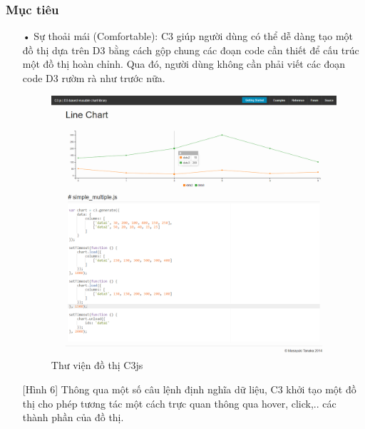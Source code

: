\documentclass[12pt,a4paper]{article}
\begin{document}
\subsubsection{Mục tiêu}
\begin{itemize}
        \item[•]Sự thoải mái (Comfortable):
        C3 giúp người dùng có thể dễ dàng tạo một đồ thị dựa trên D3 bằng cách gộp chung các đoạn code cần thiết để cấu trúc một đồ thị hoàn chỉnh. Qua đó, người dùng không cần phải viết các đoạn code D3 rườm rà như trước nữa.
\begin{figure}[htp]
	\begin{center}
    \includegraphics[scale=.3]{image/c3syntax}
    \caption{Thư viện đồ thị C3js}
    \label{refhinh6}
	\end{center}
\end{figure}
[Hình 6] Thông qua một số câu lệnh định nghĩa dữ liệu, C3 khởi tạo một đồ thị cho phép tương tác một cách trực quan thông qua hover, click,.. các thành phần của đồ thị.


\end{itemize}
\end{document}
